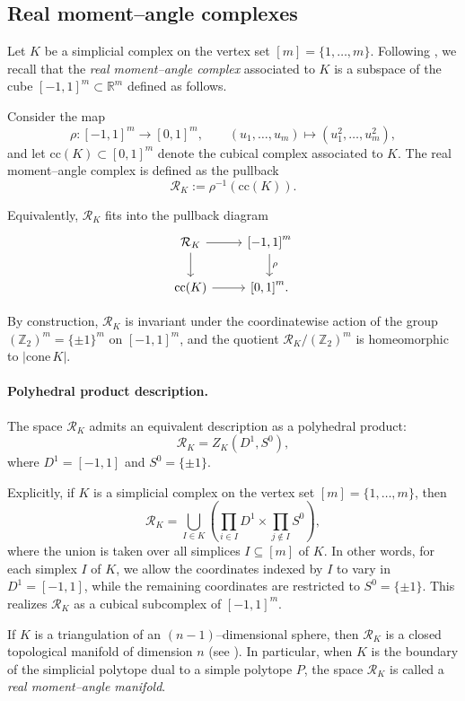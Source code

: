 \documentclass[11pt,a4paper]{article}
\numberwithin{equation}{section}
\theoremstyle{named}
\begin{document}
\subsection{Real moment--angle complexes}
\label{sec:real_MA}

Let $K$ be a simplicial complex on the vertex set $[m]=\{1,\dots,m\}$. Following \cite{tt}, we recall that the \emph{real moment--angle complex} associated to $K$ is a subspace of the cube $[-1,1]^m \subset \mathbb{R}^m$ defined as follows.

Consider the map
\[
\rho : [-1,1]^m \longrightarrow [0,1]^m,
\qquad
(u_1,\dots,u_m) \longmapsto (u_1^2,\dots,u_m^2),
\]
and let $\mathrm{cc}(K) \subset [0,1]^m$ denote the cubical complex associated to $K$. The real moment--angle complex is defined as the pullback
\[
\mathcal{R}_K := \rho^{-1}(\mathrm{cc}(K)).
\]

Equivalently, $\mathcal{R}_K$ fits into the pullback diagram
\[
\begin{tikzcd}
\mathcal{R}_K \arrow[r] \arrow[d]
&
{[-1,1]}^m \arrow[d,"\rho"]
\\
\mathrm{cc}(K) \arrow[r]
&
{[0,1]}^m.
\end{tikzcd}
\]

By construction, $\mathcal{R}_K$ is invariant under the coordinatewise action of the group $(\mathbb{Z}_2)^m = \{\pm1\}^m$ on $[-1,1]^m$, and the quotient
$\mathcal{R}_K / (\mathbb{Z}_2)^m$ is homeomorphic to $|\mathrm{cone}\,K|$.

\medskip

\paragraph*{Polyhedral product description.}

The space $\mathcal{R}_K$ admits an equivalent description as a polyhedral
product:
\[
\mathcal{R}_K = Z_K(D^1,S^0),
\]
where $D^1=[-1,1]$ and $S^0=\{\pm1\}$.

Explicitly, if $K$ is a simplicial complex on the vertex set $[m]=\{1,\dots,m\}$, then
\[
\mathcal{R}_K
=
\bigcup_{I\in K}
\left(
\prod_{i\in I} D^1
\times
\prod_{j\notin I} S^0
\right),
\]
where the union is taken over all simplices $I \subseteq [m]$ of $K$. In other words, for each simplex $I$ of $K$, we allow the coordinates indexed by $I$ to vary in $D^1=[-1,1]$, while the remaining coordinates are restricted to $S^0=\{\pm1\}$. This realizes $\mathcal{R}_K$ as a cubical subcomplex of $[-1,1]^m$.

\medskip
If $K$ is a triangulation of an $(n-1)$--dimensional sphere, then $\mathcal{R}_K$ is a closed topological manifold of dimension $n$ (see \cite[Theorem 4.1.7]{tt}). In particular, when $K$ is the boundary of the simplicial polytope dual to a simple polytope $P$, the space $\mathcal{R}_K$ is called a \emph{real moment--angle manifold}.
\end{document}
